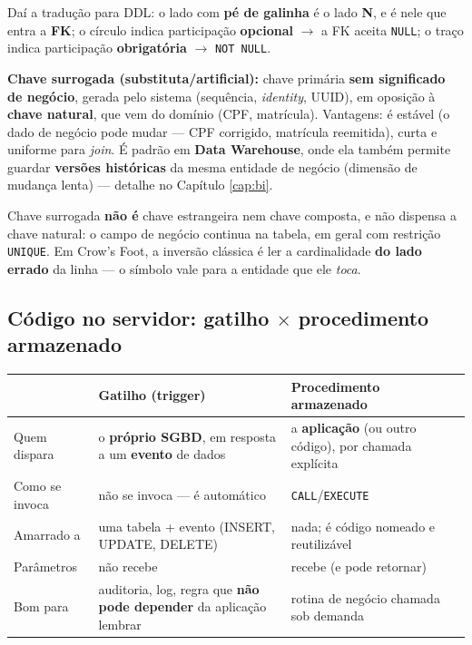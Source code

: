Daí a tradução para DDL: o lado com \textbf{pé de galinha} é o lado
\textbf{N}, e é nele que entra a \textbf{FK}; o círculo indica participação
\textbf{opcional} $\to$ a FK aceita \texttt{NULL}; o traço indica participação
\textbf{obrigatória} $\to$ \texttt{NOT NULL}.

\textbf{Chave surrogada (substituta/artificial):} chave primária
\textbf{sem significado de negócio}, gerada pelo sistema (sequência,
\emph{identity}, UUID), em oposição à \textbf{chave natural}, que vem do
domínio (CPF, matrícula). Vantagens: é estável (o dado de negócio pode mudar
--- CPF corrigido, matrícula reemitida), curta e uniforme para \emph{join}. É
padrão em \textbf{Data Warehouse}, onde ela também permite guardar
\textbf{versões históricas} da mesma entidade de negócio (dimensão de
mudança lenta) --- detalhe no Capítulo \ref{cap:bi}.

\begin{pegadinha}
Chave surrogada \textbf{não é} chave estrangeira nem chave composta, e não
dispensa a chave natural: o campo de negócio continua na tabela, em geral com
restrição \texttt{UNIQUE}. Em Crow's Foot, a inversão clássica é ler a
cardinalidade \textbf{do lado errado} da linha --- o símbolo vale para a
entidade que ele \emph{toca}.
\end{pegadinha}

\subsection{Código no servidor: gatilho $\times$ procedimento armazenado}

\begin{center}
\begin{tabular}{@{}p{2.4cm}p{4.8cm}p{4.8cm}@{}}
\toprule
& \textbf{Gatilho (trigger)} & \textbf{Procedimento armazenado} \\
\midrule
Quem dispara & o \textbf{próprio SGBD}, em resposta a um \textbf{evento} de dados & a \textbf{aplicação} (ou outro código), por chamada explícita \\
Como se invoca & não se invoca --- é automático & \texttt{CALL}/\texttt{EXECUTE} \\
Amarrado a & uma tabela + evento (INSERT, UPDATE, DELETE) & nada; é código nomeado e reutilizável \\
Parâmetros & não recebe & recebe (e pode retornar) \\
Bom para & auditoria, log, regra que \textbf{não pode depender} da aplicação lembrar & rotina de negócio chamada sob demanda \\
\bottomrule
\end{tabular}
\end{center}

